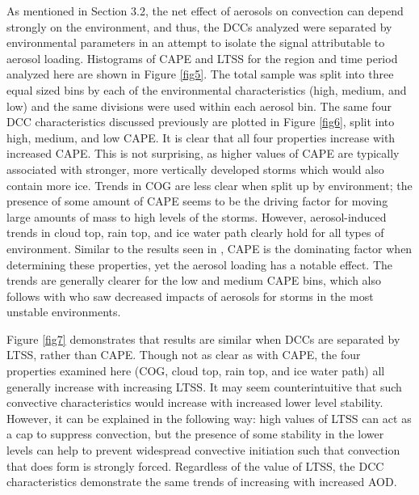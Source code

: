 As mentioned in Section 3.2, the net effect of aerosols on convection can depend strongly on the environment, and thus, the DCCs analyzed were separated by environmental parameters in an attempt to isolate the signal attributable to aerosol loading.  Histograms of CAPE and LTSS for the region and time period analyzed here are shown in Figure \ref{fig5}.  The total sample was split into three equal sized bins by each of the environmental characteristics (high, medium, and low) and the same divisions were used within each aerosol bin.  The same four DCC characteristics discussed previously are plotted in Figure \ref{fig6}, split into high, medium, and low CAPE.  It is clear that all four properties increase with increased CAPE.  This is not surprising, as higher values of CAPE are typically associated with stronger, more vertically developed storms which would also contain more ice.  Trends in COG are less clear when split up by environment; the presence of some amount of CAPE seems to be the driving factor for moving large amounts of mass to high levels of the storms.  However, aerosol-induced trends in cloud top, rain top, and ice water path clearly hold for all types of environment.  Similar to the results seen in \citet{Storer:2010p8001}, CAPE is the dominating factor when determining these properties, yet the aerosol loading has a notable effect.  The trends are generally clearer for the low and medium CAPE bins, which also follows with \citet{Storer:2010p8001} who saw decreased impacts of aerosols for storms in the most unstable environments.

Figure \ref{fig7} demonstrates that results are similar when DCCs are separated by LTSS, rather than CAPE.  Though not as clear as with CAPE, the four properties examined here (COG, cloud top, rain top, and ice water path) all generally increase with increasing LTSS.  It may seem counterintuitive that such convective characteristics would increase with increased lower level stability.  However, it can be explained in the following way: high values of LTSS can act as a cap to suppress convection, but the presence of some stability in the lower levels can help to prevent widespread convective initiation such that convection that does form is strongly forced.  Regardless of the value of LTSS, the DCC characteristics demonstrate the same trends of increasing with increased AOD.

